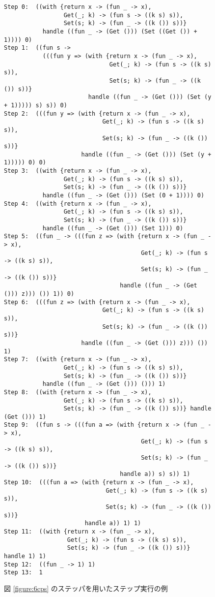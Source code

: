 \begin{figure}[b]
\begin{spacing}{0.8}
\begin{verbatim}
Step 0:  ((with {return x -> (fun _ -> x),
                 Get(_; k) -> (fun s -> ((k s) s)),
                 Set(s; k) -> (fun _ -> ((k ()) s))}
           handle ((fun _ -> (Get ())) (Set ((Get ()) + 1)))) 0)
Step 1:  ((fun s ->
           (((fun y => (with {return x -> (fun _ -> x),
                              Get(_; k) -> (fun s -> ((k s) s)),
                              Set(s; k) -> (fun _ -> ((k ()) s))}
                        handle ((fun _ -> (Get ())) (Set (y + 1))))) s) s)) 0)
Step 2:  (((fun y => (with {return x -> (fun _ -> x),
                            Get(_; k) -> (fun s -> ((k s) s)),
                            Set(s; k) -> (fun _ -> ((k ()) s))}
                      handle ((fun _ -> (Get ())) (Set (y + 1))))) 0) 0)
Step 3:  ((with {return x -> (fun _ -> x),
                 Get(_; k) -> (fun s -> ((k s) s)),
                 Set(s; k) -> (fun _ -> ((k ()) s))}
           handle ((fun _ -> (Get ())) (Set (0 + 1)))) 0)
Step 4:  ((with {return x -> (fun _ -> x),
                 Get(_; k) -> (fun s -> ((k s) s)),
                 Set(s; k) -> (fun _ -> ((k ()) s))}
           handle ((fun _ -> (Get ())) (Set 1))) 0)
Step 5:  ((fun _ -> (((fun z => (with {return x -> (fun _ -> x),
                                       Get(_; k) -> (fun s -> ((k s) s)),
                                       Set(s; k) -> (fun _ -> ((k ()) s))}
                                 handle ((fun _ -> (Get ())) z))) ()) 1)) 0)
Step 6:  (((fun z => (with {return x -> (fun _ -> x),
                            Get(_; k) -> (fun s -> ((k s) s)),
                            Set(s; k) -> (fun _ -> ((k ()) s))}
                      handle ((fun _ -> (Get ())) z))) ()) 1)
Step 7:  ((with {return x -> (fun _ -> x),
                 Get(_; k) -> (fun s -> ((k s) s)),
                 Set(s; k) -> (fun _ -> ((k ()) s))}
           handle ((fun _ -> (Get ())) ())) 1)
Step 8:  ((with {return x -> (fun _ -> x),
                 Get(_; k) -> (fun s -> ((k s) s)),
                 Set(s; k) -> (fun _ -> ((k ()) s))} handle (Get ())) 1)
Step 9:  ((fun s -> (((fun a => (with {return x -> (fun _ -> x),
                                       Get(_; k) -> (fun s -> ((k s) s)),
                                       Set(s; k) -> (fun _ -> ((k ()) s))}
                                 handle a)) s) s)) 1)
Step 10:  (((fun a => (with {return x -> (fun _ -> x),
                             Get(_; k) -> (fun s -> ((k s) s)),
                             Set(s; k) -> (fun _ -> ((k ()) s))}
                       handle a)) 1) 1)
Step 11:  ((with {return x -> (fun _ -> x),
                  Get(_; k) -> (fun s -> ((k s) s)),
                  Set(s; k) -> (fun _ -> ((k ()) s))} handle 1) 1)
Step 12:  ((fun _ -> 1) 1)
Step 13:  1
\end{verbatim}
\end{spacing}
\caption{図 \ref{figure:6cps} のステッパを用いたステップ実行の例}
\label{figure:step_example}
\end{figure}

